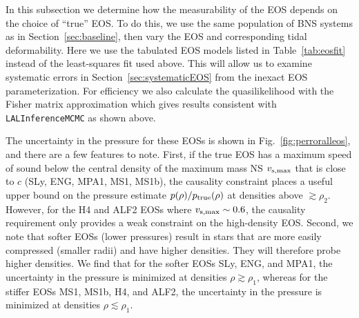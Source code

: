 \documentclass[twocolumn,prd,amssymb,aps,nofootinbib,showpacs,epsf]{revtex4}
\begin{document}
In this subsection we determine how the measurability of the EOS depends on the choice of ``true'' EOS. To do this, we use the same population of BNS systems as in Section~\ref{sec:baseline}, then vary the EOS and corresponding tidal deformability. Here we use the tabulated EOS models listed in Table~\ref{tab:eosfit} instead of the least-squares fit used above. This will allow us to examine systematic errors in Section~\ref{sec:systematicEOS} from the inexact EOS parameterization. For efficiency we also calculate the quasilikelihood with the Fisher matrix approximation which gives results consistent with \texttt{LALInferenceMCMC} as shown above.

The uncertainty in the pressure for these EOSs is shown in Fig.~\ref{fig:perroralleos}, and there are a few features to note. First, if the true EOS has a maximum speed of sound below the central density of the maximum mass NS $v_{\rm s, max}$ that is close to $c$ (SLy, ENG, MPA1, MS1, MS1b), the causality constraint places a useful upper bound on the pressure estimate $p(\rho)/p_{\rm true}(\rho)$ at densities above $\gtrsim \rho_2$. However, for the H4 and ALF2 EOSs where $v_{\rm s, max} \sim 0.6$, the causality requirement only provides a weak constraint on the high-density EOS. Second, we note that softer EOSs (lower pressures) result in stars that are more easily compressed (smaller radii) and have higher densities. They will therefore probe higher densities. We find that for the softer EOSs SLy, ENG, and MPA1, the uncertainty in the pressure is minimized at densities $\rho \gtrsim \rho_1$, whereas for the stiffer EOSs MS1, MS1b, H4, and ALF2, the uncertainty in the pressure is minimized at densities $\rho \lesssim \rho_1$.
\end{document}
